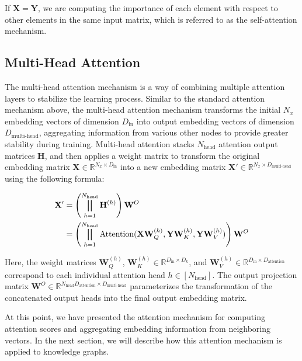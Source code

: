 If $\mathbf{X} = \mathbf{Y}$, we are computing the importance of each element with respect to other elements in the same input matrix, which is referred to as the self-attention mechanism.


\subsection{Multi-Head Attention}

The multi-head attention mechanism is a way of combining multiple attention layers to stabilize the learning process. Similar to the standard attention mechanism above, the multi-head attention mechanism transforms the initial $N_x$ embedding vectors of dimension $D_{\text{in}}$ into output embedding vectors of dimension $D_{\text{multi-head}}$, aggregating information from various other nodes to provide greater stability during training. Multi-head attention stacks $N_{\text{head}}$ attention output matrices $\mathbf{H}$, and then applies a weight matrix to transform the original embedding matrix $\mathbf{X} \in \mathbb{R}^{N_x \times D_\text{in}}$ into a new embedding matrix $\mathbf{X}' \in \mathbb{R}^{N_x \times D_{\text{multi-head}}}$ using the following formula:

\begin{equation}
	\label{headAttention}
	\begin{split}
		\mathbf{X}'& =\left(\bigparallel_{h=1}^{N_{\text{head}}}\mathbf{H}^{(h)}\right)\mathbf{W}^{O} \\
		& = \left(\bigparallel_{h=1}^{N_{\text{head}}} \text{Attention}(\mathbf{X} \mathbf{W}_Q^{(h)}, \mathbf{Y} \mathbf{W}_K^{(h)}, \mathbf{Y} \mathbf{W}_V^{(h)}) \right)\mathbf{W}^{O}
	\end{split}
\end{equation}

Here, the weight matrices $\mathbf{W}_Q^{(h)}$, $\mathbf{W}_K^{(h)} \in \mathbb{R}^{D_{\text{in}} \times D_{k}}$, and $\mathbf{W}_V^{(h)} \in \mathbb{R}^{D_{\text{in}} \times D_{\text{attention}}}$ correspond to each individual attention head $h \in [N_{\text{head}}]$. The output projection matrix $\mathbf{W}^{O} \in \mathbb{R}^{N_{\text{head}} D_{\text{attention}} \times D_{\text{multi-head}}}$ parameterizes the transformation of the concatenated output heads into the final output embedding matrix.

At this point, we have presented the attention mechanism for computing attention scores and aggregating embedding information from neighboring vectors. In the next section, we will describe how this attention mechanism is applied to knowledge graphs.

